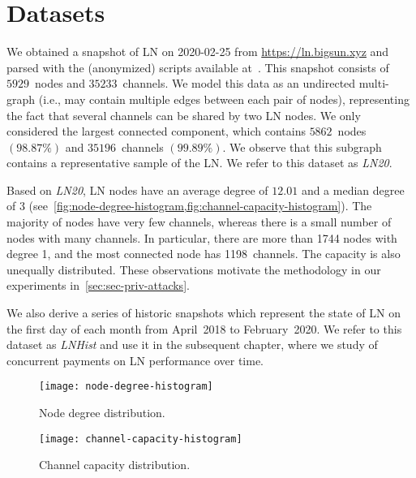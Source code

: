 \section{Datasets}
\label{sec:datasets}



We obtained a snapshot of LN on 2020-02-25 from \url{https://ln.bigsun.xyz} and parsed with the (anonymized) scripts available at~\cite{Tikhomirov2019}.
This snapshot consists of $5929$~nodes and $35233$~channels.
We model this data as an undirected multi-graph (i.e., may contain multiple edges between each pair of nodes), 
representing the fact that several channels can be shared by two LN nodes.
We only considered the largest connected component, 
which contains $5862$~nodes $(98.87\%)$ and $35196$~channels $(99.89\%)$.
We observe that this subgraph contains a representative sample of the LN.
We refer to this dataset as \emph{LN20}.

Based on \emph{LN20}, 
LN nodes have an average degree of $12.01$ and a median degree of $3$ (see~\cref{fig:node-degree-histogram,fig:channel-capacity-histogram}).
The majority of nodes have very few channels, 
whereas there is a small number of nodes with many channels. 
In particular, there are more than 1744 nodes with degree 1, and the most connected node has 1198~channels.
The capacity is also unequally distributed.
These observations motivate the methodology in our experiments in~\cref{sec:sec-priv-attacks}. 

We also derive a series of historic snapshots which represent the state of LN on the first day of each month from April~2018 to February~2020.
We refer to this dataset as \textit{LNHist} 
and use it in the subsequent chapter, where we study of concurrent payments on LN performance over time.


\begin{figure}[tb]
	\centering
	\texttt{[image: node-degree-histogram]}
	\caption{Node degree distribution.\label{fig:node-degree-histogram}}
\end{figure}

\begin{figure}[tb]
	\centering
	\texttt{[image: channel-capacity-histogram]}
	\caption{Channel capacity distribution.\label{fig:channel-capacity-histogram}}
\end{figure}

